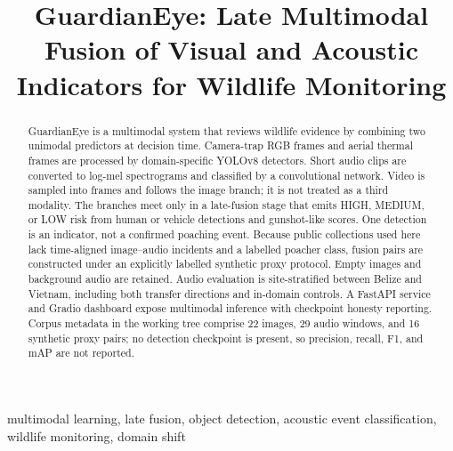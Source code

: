 \documentclass[conference]{IEEEtran}
\begin{document}
\title{GuardianEye: Late Multimodal Fusion of Visual and Acoustic Indicators for Wildlife Monitoring}

\author{
}

\maketitle

\begin{abstract}
GuardianEye is a multimodal system that reviews wildlife evidence by combining two unimodal predictors at decision time. Camera-trap RGB frames and aerial thermal frames are processed by domain-specific YOLOv8 detectors. Short audio clips are converted to log-mel spectrograms and classified by a convolutional network. Video is sampled into frames and follows the image branch; it is not treated as a third modality. The branches meet only in a late-fusion stage that emits HIGH, MEDIUM, or LOW risk from human or vehicle detections and gunshot-like scores. One detection is an indicator, not a confirmed poaching event. Because public collections used here lack time-aligned image--audio incidents and a labelled poacher class, fusion pairs are constructed under an explicitly labelled synthetic proxy protocol. Empty images and background audio are retained. Audio evaluation is site-stratified between Belize and Vietnam, including both transfer directions and in-domain controls. A FastAPI service and Gradio dashboard expose multimodal inference with checkpoint honesty reporting. Corpus metadata in the working tree comprise 22 images, 29 audio windows, and 16 synthetic proxy pairs; no detection checkpoint is present, so precision, recall, F1, and mAP are not reported.
\end{abstract}

\begin{IEEEkeywords}
multimodal learning, late fusion, object detection, acoustic event classification, wildlife monitoring, domain shift
\end{IEEEkeywords}
\end{document}
